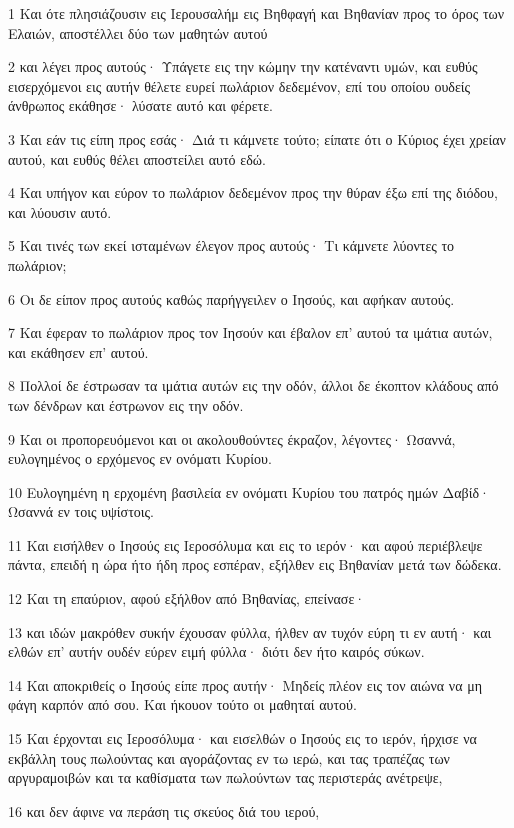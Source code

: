 \par 1 Και ότε πλησιάζουσιν εις Ιερουσαλήμ εις Βηθφαγή και Βηθανίαν προς το όρος των Ελαιών, αποστέλλει δύο των μαθητών αυτού
\par 2 και λέγει προς αυτούς· Υπάγετε εις την κώμην την κατέναντι υμών, και ευθύς εισερχόμενοι εις αυτήν θέλετε ευρεί πωλάριον δεδεμένον, επί του οποίου ουδείς άνθρωπος εκάθησε· λύσατε αυτό και φέρετε.
\par 3 Και εάν τις είπη προς εσάς· Διά τι κάμνετε τούτο; είπατε ότι ο Κύριος έχει χρείαν αυτού, και ευθύς θέλει αποστείλει αυτό εδώ.
\par 4 Και υπήγον και εύρον το πωλάριον δεδεμένον προς την θύραν έξω επί της διόδου, και λύουσιν αυτό.
\par 5 Και τινές των εκεί ισταμένων έλεγον προς αυτούς· Τι κάμνετε λύοντες το πωλάριον;
\par 6 Οι δε είπον προς αυτούς καθώς παρήγγειλεν ο Ιησούς, και αφήκαν αυτούς.
\par 7 Και έφεραν το πωλάριον προς τον Ιησούν και έβαλον επ' αυτού τα ιμάτια αυτών, και εκάθησεν επ' αυτού.
\par 8 Πολλοί δε έστρωσαν τα ιμάτια αυτών εις την οδόν, άλλοι δε έκοπτον κλάδους από των δένδρων και έστρωνον εις την οδόν.
\par 9 Και οι προπορευόμενοι και οι ακολουθούντες έκραζον, λέγοντες· Ωσαννά, ευλογημένος ο ερχόμενος εν ονόματι Κυρίου.
\par 10 Ευλογημένη η ερχομένη βασιλεία εν ονόματι Κυρίου του πατρός ημών Δαβίδ· Ωσαννά εν τοις υψίστοις.
\par 11 Και εισήλθεν ο Ιησούς εις Ιεροσόλυμα και εις το ιερόν· και αφού περιέβλεψε πάντα, επειδή η ώρα ήτο ήδη προς εσπέραν, εξήλθεν εις Βηθανίαν μετά των δώδεκα.
\par 12 Και τη επαύριον, αφού εξήλθον από Βηθανίας, επείνασε·
\par 13 και ιδών μακρόθεν συκήν έχουσαν φύλλα, ήλθεν αν τυχόν εύρη τι εν αυτή· και ελθών επ' αυτήν ουδέν εύρεν ειμή φύλλα· διότι δεν ήτο καιρός σύκων.
\par 14 Και αποκριθείς ο Ιησούς είπε προς αυτήν· Μηδείς πλέον εις τον αιώνα να μη φάγη καρπόν από σου. Και ήκουον τούτο οι μαθηταί αυτού.
\par 15 Και έρχονται εις Ιεροσόλυμα· και εισελθών ο Ιησούς εις το ιερόν, ήρχισε να εκβάλλη τους πωλούντας και αγοράζοντας εν τω ιερώ, και τας τραπέζας των αργυραμοιβών και τα καθίσματα των πωλούντων τας περιστεράς ανέτρεψε,
\par 16 και δεν άφινε να περάση τις σκεύος διά του ιερού,
